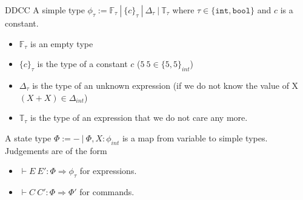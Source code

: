 \documentclass[11pt]{beamer}
\newcommand{\Z}{\mathbb{Z}}
\newcommand{\B}{\mathbb{B}}
\newcommand{\St}{\mathbb{S}}
\begin{document}
\begin{frame}{DDCC}
A simple type $\phi_\tau:=\mathbb{F}_\tau~|~\{c\}_\tau~|~\Delta_\tau~|~\mathbb{T}_\tau$ where $\tau\in\{\mathtt{int,bool}\}$ and $c$ is a constant.
\begin{itemize}
\item $\mathbb{F}_\tau$ is an empty type
\item $\{c\}_\tau$ is the type of a constant $c$ ($5~5 \in \{5,5\}_{int}$)
\item $\Delta_\tau$ is the type of an unknown expression (if we do not know the value of X $(X + X) \in \Delta_{int}$)
\item $\mathbb{T}_\tau$ is the type of an expression that we do not care any more.
\end{itemize}
A state type $\Phi := -~|~\Phi,X:\phi_{int}$ is a map from variable to simple types.\\
Judgements are of the form
\begin{itemize}
\item $\vdash E~E':\Phi\Rightarrow\phi_\tau$ for expressions.
\item $\vdash C~C':\Phi\Rightarrow\Phi'$ for commands.
\end{itemize}
\end{frame}

\end{document}
